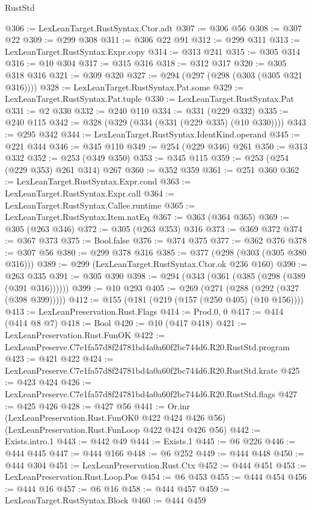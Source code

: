 \begin{lexlean}{RustStd}
\begin{coremodule}
@306 := LexLeanTarget.RustSyntax.Ctor.adt
@307 := @306 @56
@308 := @307 @22
@309 := @299 @308
@311 := @306 @22 @91
@312 := @299 @311
@313 := LexLeanTarget.RustSyntax.Expr.copy
@314 := @313 @241
@315 := @305 @314
@316 := @10 @304
@317 := @315 @316
@318 := @312 @317
@320 := @305 @318 @316
@321 := @309 @320
@327 := @294 (@297 (@298 (@303 (@305 @321 @316))))
@328 := LexLeanTarget.RustSyntax.Pat.some
@329 := LexLeanTarget.RustSyntax.Pat.tuple
@330 := LexLeanTarget.RustSyntax.Pat
@331 := @2 @330
@332 := @240 @110
@334 := @331 (@229 @332)
@335 := @240 @115
@342 := @328 (@329 (@334 (@331 (@229 @335) (@10 @330))))
@343 := @295 @342
@344 := LexLeanTarget.RustSyntax.IdentKind.operand
@345 := @221 @344
@346 := @345 @110
@349 := @254 (@229 @346) @261
@350 := @313 @332
@352 := @253 (@349 @350)
@353 := @345 @115
@359 := @253 (@254 (@229 @353) @261 @314) @267
@360 := @352 @359
@361 := @251 @360
@362 := LexLeanTarget.RustSyntax.Expr.cond
@363 := LexLeanTarget.RustSyntax.Expr.call
@364 := LexLeanTarget.RustSyntax.Callee.runtime
@365 := LexLeanTarget.RustSyntax.Item.natEq
@367 := @363 (@364 @365)
@369 := @305 (@263 @346)
@372 := @305 (@263 @353) @316
@373 := @369 @372
@374 := @367 @373
@375 := Bool.false
@376 := @374 @375
@377 := @362 @376
@378 := @307 @56
@380 := @299 @378 @316
@385 := @377 (@298 (@303 (@305 @380 @316)))
@389 := @299 (LexLeanTarget.RustSyntax.Ctor.ok @236 @160)
@390 := @263 @335
@391 := @305 @390
@398 := @294 (@343 (@361 (@385 (@298 (@389 (@391 @316))))))
@399 := @10 @293
@405 := @269 (@271 (@288 (@292 (@327 (@398 @399)))))
@412 := @155 (@181 (@219 (@157 (@250 @405) (@10 @156))))
@413 := LexLeanPreservation.Rust.Flags
@414 := Prod.{0, 0}
@417 := @414 (@414 @8 @7)
@418 := Bool
@420 := @10 (@417 @418)
@421 := LexLeanPreservation.Rust.FunOK
@422 := LexLeanPreserve.C7e1fa57d8f24781bd4a0a60f2bc744d6.R20.RustStd.program
@423 := @421 @422
@424 := LexLeanPreserve.C7e1fa57d8f24781bd4a0a60f2bc744d6.R20.RustStd.krate
@425 := @423 @424
@426 := LexLeanPreserve.C7e1fa57d8f24781bd4a0a60f2bc744d6.R20.RustStd.flags
@427 := @425 @426
@428 := @427 @56
@441 := Or.inr
    (LexLeanPreservation.Rust.FunOK0 @422 @424 @426 @56)
    (LexLeanPreservation.Rust.FunLoop @422 @424 @426 @56)
@442 := Exists.intro.{1}
@443 := @442 @49
@444 := Exists.{1}
@445 := @6 @226
@446 := @444 @445
@447 := @444 @166
@448 := @6 @252
@449 := @444 @448
@450 := @444 @304
@451 := LexLeanPreservation.Rust.Ctx
@452 := @444 @451
@453 := LexLeanPreservation.Rust.Loop.Pos
@454 := @6 @453
@455 := @444 @454
@456 := @444 @16
@457 := @6 @16
@458 := @444 @457
@459 := LexLeanTarget.RustSyntax.Block
@460 := @444 @459

\end{coremodule}
\end{lexlean}
